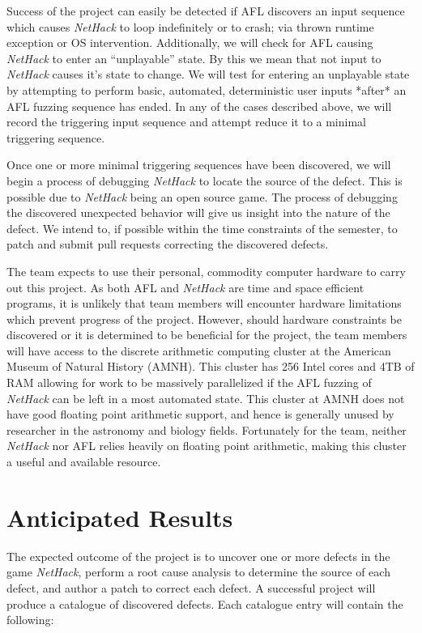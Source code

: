 \documentclass[12pt]{diazessay}
\begin{document}
Success of the project can easily be detected if AFL discovers an input sequence which causes \emph{NetHack} to loop indefinitely or to crash; via thrown runtime exception or OS intervention.
Additionally, we will check for AFL causing \emph{NetHack} to enter an ``unplayable'' state.
By this we mean that not input to \emph{NetHack} causes it's state to change.
We will test for entering an unplayable state by attempting to perform basic, automated, deterministic user inputs *after* an AFL fuzzing sequence has ended.
In any of the cases described above, we will record the triggering input sequence and attempt reduce it to a minimal triggering sequence.

Once one or more minimal triggering sequences have been discovered, we will begin a process of debugging \emph{NetHack} to locate the source of the defect.
This is possible due to \emph{NetHack} being an open source game.
The process of debugging the discovered unexpected behavior will give us insight into the nature of the defect.
We intend to, if possible within the time constraints of the semester, to patch and submit pull requests correcting the discovered defects.

The team expects to use their personal, commodity computer hardware to carry out this project.
As both AFL and \emph{NetHack} are time and space efficient programs, it is unlikely that team members will encounter hardware limitations which prevent progress of the project.
However, should hardware constraints be discovered or it is determined to be beneficial for the project, the team members will have access to the discrete arithmetic computing cluster at the American Museum of Natural History (AMNH).
This cluster has 256 Intel cores and 4TB of RAM allowing for work to be massively parallelized if the AFL fuzzing of \emph{NetHack} can be left in a most automated state.
This cluster at AMNH does not have good floating point arithmetic support, and hence is generally unused by researcher in the astronomy and biology fields.
Fortunately for the team, neither \emph{NetHack} nor AFL relies heavily on floating point arithmetic, making this cluster a useful and available resource.



\section*{Anticipated Results}
\label{results}

The expected outcome of the project is to uncover one or more defects in the game \emph{NetHack}, perform a root cause analysis to determine the source of each defect, and author a patch to correct each defect. 
A successful project will produce a catalogue of discovered defects. 
Each catalogue entry will contain the following: 
\end{document}
